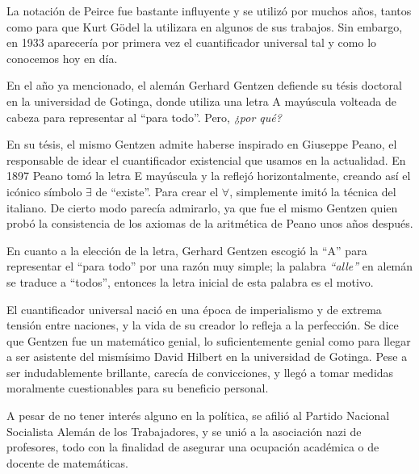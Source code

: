 \documentclass[11pt, a4paper]{article}
\begin{document}
La notación de Peirce fue bastante influyente y se utilizó por muchos años, tantos como para que Kurt Gödel la utilizara en algunos de sus trabajos. Sin embargo, en 1933 aparecería por primera vez el cuantificador universal tal y como lo conocemos hoy en día. 

En el año ya mencionado, el alemán Gerhard Gentzen defiende su tésis doctoral en la universidad de Gotinga, donde utiliza una letra A mayúscula volteada de cabeza para representar al “para todo”. Pero, \emph{¿por qué?}

En su tésis, el mismo Gentzen admite haberse inspirado en Giuseppe Peano, el responsable de idear el cuantificador existencial que usamos en la actualidad. En 1897 Peano tomó la letra E mayúscula y la reflejó horizontalmente, creando así el icónico símbolo $\exists$  de “existe”. Para crear el $\forall$, simplemente imitó la técnica del italiano. De cierto modo parecía admirarlo, ya que fue el mismo Gentzen quien probó la consistencia de los axiomas de la aritmética de Peano unos años después. 

En cuanto a la elección de la letra, Gerhard Gentzen escogió la “A” para representar el “para todo” por una razón muy simple; la palabra \emph{“alle”} en alemán se traduce a “todos”, entonces la letra inicial de esta palabra es el motivo. 

El cuantificador universal nació en una época de imperialismo y de extrema tensión entre naciones,  y la vida de su creador lo refleja a la perfección. 
Se dice que Gentzen fue un matemático genial, lo suficientemente genial como para llegar a ser asistente del mismísimo David Hilbert en la universidad de Gotinga. Pese a ser indudablemente brillante, carecía de convicciones, y llegó a tomar medidas moralmente cuestionables para su beneficio personal. 

A pesar de no tener interés alguno en la política, se afilió al Partido Nacional Socialista Alemán de los Trabajadores, y se unió a la asociación nazi de profesores, todo con la finalidad de asegurar una ocupación académica o de docente de matemáticas. 
\end{document}
